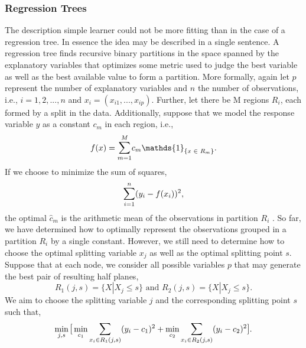 \documentclass[a4paper,12pt, headsepline]{scrartcl}
\DeclareMathOperator*{\minA}{min}
\numberwithin{equation}{section}
\begin{document}
\subsubsection{Regression Trees}\label{subsubsec:trees}
The description simple learner could not be more fitting than in the case of a regression tree. In essence the idea may be described in a single sentence. A regression tree finds recursive binary partitions in the space spanned by the explanatory variables that optimizes some metric used to judge the best variable as well as the best available value to form a partition. More formally, again let $p$ represent the number of explanatory variables and $n$ the number of observations, i.e., $i = 1, 2, ..., n$ and $x_i = (x_{i1}, ..., x_{ip})$. Further, let there be M regions $R_i$, each formed by a split in the data. Additionally, suppose that we model the response variable $y$ as a constant $c_m$ in each region, i.e.,
\[
f(x) = \mathlarger{\sum}\limits_{m = 1}^{M} c_m \mathds{1}_{\{x \text{ } \in \text{ } R_m\}}.
\]
If we choose to minimize the sum of squares, 
\[
\mathlarger{\sum}\limits_{i = 1}^{n}(y_i - f(x_i))^2,
\]
the optimal $\hat c_m$ is the arithmetic mean of the observations in partition $R_i$ \citep{hastie09}. So far, we have determined how to optimally represent the observations grouped in a partition $R_i$ by a single constant. However, we still need to determine how to choose the optimal splitting variable $x_j$ as well as the optimal splitting point $s$. Suppose that at each node, we consider all possible variables $p$ that may generate the best pair of resulting half planes,
\[
R_1(j, s) = \{X|X_j \leq s\} \text{ and } R_2(j, s) = \{X|X_j \leq s\}.
\]
We aim to choose the splitting variable $j$ and the corresponding splitting point $s$ such that,
\[
\minA_{j, s}\mathlarger{[} \minA_{c_1} \mathlarger{\sum}\limits_{x_i \in R_1(j, s)} (y_i - c_1)^2 + \minA_{c_2} \mathlarger{\sum}\limits_{x_i \in R_2(j, s)} (y_i - c_2)^2 \mathlarger{]}.
\]
\end{document}
